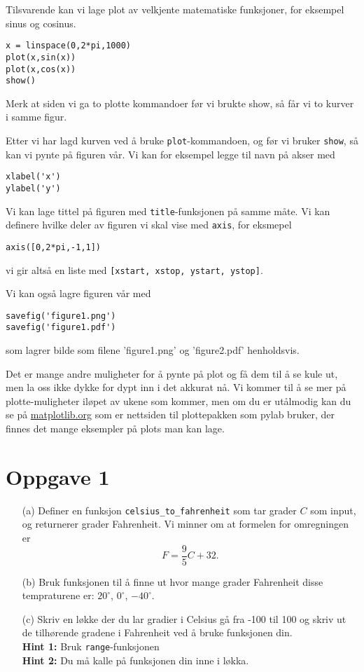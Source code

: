 \documentclass[a4paper, 11pt, notitlepage, english]{article}
\begin{document}
Tilsvarende kan vi lage plot av velkjente matematiske funksjoner, for eksempel sinus og cosinus.
\begin{lstlisting}
x = linspace(0,2*pi,1000)
plot(x,sin(x))
plot(x,cos(x))
show()
\end{lstlisting}
\vspace{-0.3cm}
Merk at siden vi ga to plotte kommandoer før vi brukte show, så får vi to kurver i samme figur.

Etter vi har lagd kurven ved å bruke \verb+plot+-kommandoen, og før vi bruker \verb+show+, så kan vi pynte på figuren vår. Vi kan for eksempel legge til navn på akser med
\begin{lstlisting}
xlabel('x')
ylabel('y')
\end{lstlisting}
\vspace{-0.3cm}
Vi kan lage tittel på figuren med \verb+title+-funksjonen på samme måte. Vi kan definere hvilke deler av figuren vi skal vise med \verb+axis+, for eksmepel
\begin{lstlisting}
axis([0,2*pi,-1,1])
\end{lstlisting}
\vspace{-0.3cm}
vi gir altså en liste med \verb+[xstart, xstop, ystart, ystop]+.

Vi kan også lagre figuren vår med
\begin{lstlisting}
savefig('figure1.png')
savefig('figure1.pdf')
\end{lstlisting}
\vspace{-0.3cm}
som lagrer bilde som filene 'figure1.png' og 'figure2.pdf' henholdsvis.

Det er mange andre muligheter for å pynte på plot og få dem til å se kule ut, men la oss ikke dykke for dypt inn i det akkurat nå. Vi kommer til å se mer på plotte-muligheter iløpet av ukene som kommer, men om du er utålmodig kan du se på \url{matplotlib.org} som er nettsiden til plottepakken som pylab bruker, der finnes det mange eksempler på plots man kan lage.



\clearpage


\section*{Oppgave 1}
\begin{itemize}
\item[(a)] Definer en funksjon \verb+celsius_to_fahrenheit+ som tar grader $C$ som input, og returnerer grader Fahrenheit. Vi minner om at formelen for omregningen er
$$F = \frac{9}{5}C + 32.$$
\item[(b)] Bruk funksjonen til å finne ut hvor mange grader Fahrenheit disse tempraturene er: $20^\circ$, $0^\circ$, $-40^\circ$. 
\item[(c)] Skriv en løkke der du lar gradier i Celsius gå fra -100 til 100 og skriv ut de tilhørende gradene i Fahrenheit ved å bruke funksjonen din. \\ \textbf{Hint 1:} Bruk \texttt{range}-funksjonen \\
\textbf{Hint 2:} Du må kalle på funksjonen din inne i løkka.
\end{itemize}
\end{document}
